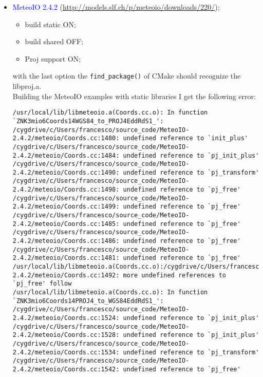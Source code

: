 \begin{itemize}
\begin{itemize}
\begin{lstlisting}[style=bashStyle]
[fra@sidereus] ~ $ make
[fra@sidereus] ~ $ make install
    \end{lstlisting}
  \end{itemize}
\item \textcolor{blue}{MeteoIO 2.4.2} (\url{http://models.slf.ch/p/meteoio/downloads/220/});
  \begin{itemize}
  \item build static ON;
  \item build shared OFF;
  \item Proj support ON;
  \end{itemize}
  with the last option the \lstinline!find_package()! of CMake should recognize the libproj.a.\\
  Building the MeteoIO examples with static libraries I get the following error:
    \begin{fullwidth}
  \begin{lstlisting}[style=bashStyle]
/usr/local/lib/libmeteoio.a(Coords.cc.o): In function `ZNK3mio6Coords14WGS84_to_PROJ4EddRdS1_':
/cygdrive/c/Users/francesco/source_code/MeteoIO-2.4.2/meteoio/Coords.cc:1480: undefined reference to `init_plus'
/cygdrive/c/Users/francesco/source_code/MeteoIO-2.4.2/meteoio/Coords.cc:1484: undefined reference to `pj_init_plus'
/cygdrive/c/Users/francesco/source_code/MeteoIO-2.4.2/meteoio/Coords.cc:1490: undefined reference to `pj_transform'
/cygdrive/c/Users/francesco/source_code/MeteoIO-2.4.2/meteoio/Coords.cc:1498: undefined reference to `pj_free'
/cygdrive/c/Users/francesco/source_code/MeteoIO-2.4.2/meteoio/Coords.cc:1499: undefined reference to `pj_free'
/cygdrive/c/Users/francesco/source_code/MeteoIO-2.4.2/meteoio/Coords.cc:1485: undefined reference to `pj_free'
/cygdrive/c/Users/francesco/source_code/MeteoIO-2.4.2/meteoio/Coords.cc:1486: undefined reference to `pj_free'
/cygdrive/c/Users/francesco/source_code/MeteoIO-2.4.2/meteoio/Coords.cc:1481: undefined reference to `pj_free'
/usr/local/lib/libmeteoio.a(Coords.cc.o):/cygdrive/c/Users/francesco/source_code/MeteoIO-2.4.2/meteoio/Coords.cc:1492: more undefined references to `pj_free' follow
/usr/local/lib/libmeteoio.a(Coords.cc.o): In function `ZNK3mio6Coords14PROJ4_to_WGS84EddRdS1_':
/cygdrive/c/Users/francesco/source_code/MeteoIO-2.4.2/meteoio/Coords.cc:1524: undefined reference to `pj_init_plus'
/cygdrive/c/Users/francesco/source_code/MeteoIO-2.4.2/meteoio/Coords.cc:1528: undefined reference to `pj_init_plus'
/cygdrive/c/Users/francesco/source_code/MeteoIO-2.4.2/meteoio/Coords.cc:1534: undefined reference to `pj_transform'
/cygdrive/c/Users/francesco/source_code/MeteoIO-2.4.2/meteoio/Coords.cc:1542: undefined reference to `pj_free'

\end{lstlisting}
\end{fullwidth}
\end{itemize}
